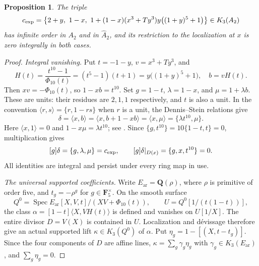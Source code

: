 \documentclass[11pt,a4paper]{amsart}
\numberwithin{equation}{section}
\newtheorem{proposition}[theorem]{Proposition}
\theoremstyle{definition}
\theoremstyle{remark}
\begin{document}
\begin{proposition}
\label{d2ext:dimtwoExplicitTriple}
The triple
\begin{equation}\label{d2ext:eq-explicit-triple}
 c_{\rm exp}=\left\{2+y,\ 1-x,\
 1+(1-x)(x^3+Ty^3)y\bigl((1+y)^5+1\bigr)\right\}\in K_3(A_2)
\end{equation}
has infinite order in $A_2$ and in $\widehat A_2$, and its
restriction to the localization at $x$ is zero integrally in both cases.
\end{proposition}

\begin{proof}
\emph{Integral vanishing.}
Put $t=-1-y$, $v=x^3+Ty^3$, and
\[
 H(t)=\frac{t^{10}-1}{\Phi_{10}(t)}=(t^5-1)(t+1)
      =y\bigl((1+y)^5+1\bigr),\quad b=vH(t).
\]
Then $xv=-\Phi_{10}(t)$, so $1-xb=t^{10}$.
Set $g=1-t$, $\lambda=1-x$, and $\mu=1+\lambda b$.
These are units: their residues are $2,1,1$ respectively, and
$t$ is also a unit. In the convention
$\langle r,s\rangle=\{r,1-rs\}$ when $r$ is a unit, the
Dennis--Stein relations give
\[
 \delta=\langle x,b\rangle
 =\langle x,b+1-xb\rangle=\langle x,\mu\rangle
 =\{\lambda t^{10},\mu\}.
\]
Here $\langle x,1\rangle=0$ and $1-x\mu=\lambda t^{10}$;
see \cite[Chapter~III, Definition~5.11 and relations (D1)--(D3)]{Weibel}.
Since $\{g,t^{10}\}=10\{1-t,t\}=0$, multiplication gives
\begin{equation}\label{d2ext:dimtwoDSidentity}
 [g]\delta=\{g,\lambda,\mu\}=c_{\rm exp},\qquad
 [g]\delta|_{D(x)}=\{g,x,t^{10}\}=0.
\end{equation}
All identities are integral and persist under every ring map in use.

\emph{The universal supported coefficients.}
Write $E_{\mathrm{ar}}=\mathbf Q(\rho)$, where $\rho$ is primitive of order five,
and $t_g=-\rho^g$ for $g\in\mathbf F_5^\times$. On the smooth surface
\[
 Q^0=\operatorname{Spec}E_{\mathrm{ar}}[X,V,t]/(XV+\Phi_{10}(t)),\qquad
 U=Q^0[1/(t(1-t))],
\]
the class $\alpha=[1-t]\langle X,VH(t)\rangle$ is defined and
vanishes on $U[1/X]$. The entire divisor $D=V(X)$ is contained
in $U$. Localization and d\'evissage therefore give an actual
supported lift $\kappa\in K_3(Q^0)$ of $\alpha$.
Put $\eta_g=1-[(X,t-t_g)]$. Since the four components of $D$
are affine lines, $\kappa=\sum_g\gamma_g\eta_g$ with
$\gamma_g\in K_3(E_{\mathrm{ar}})$, and $\sum_g\eta_g=0$.


\end{proof}
\end{document}

